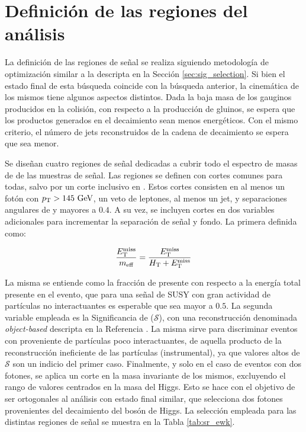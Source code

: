 \section{Definición de las regiones del análisis}

La definición de las regiones de señal se realiza siguiendo metodología de optimización similar a la descripta en la Sección \ref{sec:sig_selection}.
Si bien el estado final de esta búsqueda coincide con la búsqueda anterior, la cinemática de los mismos tiene algunos aspectos distintos. Dada la baja masa de los gauginos producidos en la colisión, con respecto a la producción de gluinos, se espera que los productos generados en el decaimiento sean menos energéticos. Con el mismo criterio, el número de jets reconstruidos de la cadena de decaimiento se espera que sea menor.

Se diseñan cuatro regiones de señal dedicadas a cubrir todo el espectro de masas de \ninoone de las muestras de señal. Las regiones se definen con cortes comunes para todas, salvo por un corte inclusivo en \met. Estos cortes consisten en al menos un fotón con $p_{\text{T}}>145\ \text{GeV}$, un veto de leptones, al menos un jet, y separaciones angulares de \dphijetmet y \dphigammet mayores a $0.4$. A su vez, se incluyen cortes en dos variables adicionales para incrementar la separación de señal y fondo. La primera definida como:

\begin{equation}
  \frac{E_{\text{T}}^{\text{miss}}}{m_{\text{eff}}} = \frac{E_{\text{T}}^{\text{miss}}}{H_{\text{T}} + E_{\text{T}}^{\text{miss}}}
\end{equation}

La misma se entiende como la fracción de \met presente con respecto a la energía total presente en el evento, que para una señal de SUSY con gran actividad de partículas no interactuantes es esperable que sea mayor a $0.5$.
La segunda variable empleada es la Significancia de \met ($\mathcal{S}$), con una reconstrucción denominada \textit{object-based} descripta en la Referencia \cite{ATLAS-CONF-2018-038}. La misma sirve para discriminar eventos con \met proveniente de partículas poco interactuantes, de aquella producto de la reconstrucción ineficiente de las partículas (instrumental), ya que valores altos de $\mathcal{S}$ son un indicio del primer caso. Finalmente, y solo en el caso de eventos con dos fotones, se aplica un corte en la masa invariante de los mismos, excluyendo el rango de valores centrados en la masa del Higgs. Esto se hace con el objetivo de ser ortogonales al análisis con estado final similar, que selecciona dos fotones provenientes del decaimiento del bosón de Higgs. La selección empleada para las distintas regiones de señal se muestra en la Tabla \ref{tab:sr_ewk}.



